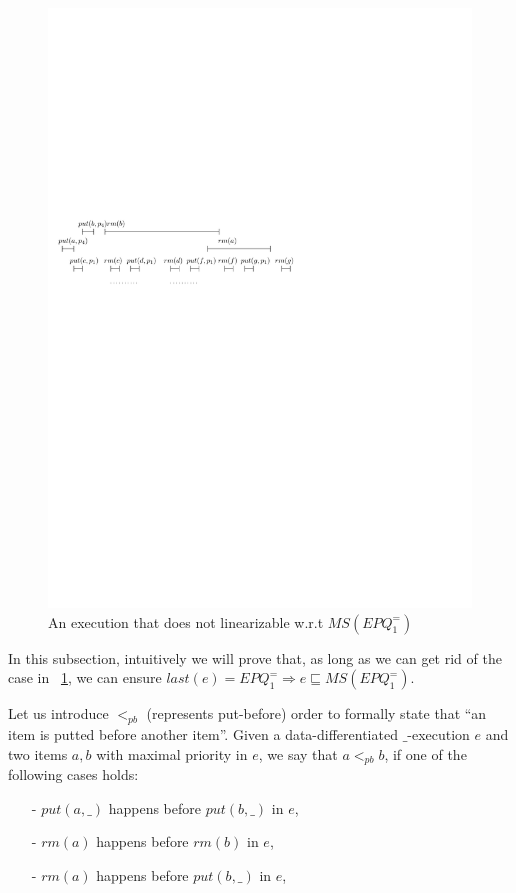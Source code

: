 \begin{figure}[htbp]
  \centering
  \includegraphics[width=0.6 \textwidth]{figures/PIC-HIS-INTRO-PB-ORDER-EPQ.pdf}
  \caption{An execution that does not linearizable w.r.t $\textit{MS}(\textit{EPQ}_1^{=})$}
  \label{fig:introduce pb order}
\end{figure}

In this subsection, intuitively we will prove that, as long as we can get rid of the case in \figurename~\ref{fig:introduce pb order}, we can ensure $\textit{last}(e) = \textit{EPQ}_1^{=} \Rightarrow e \sqsubseteq \textit{MS}(\textit{EPQ}_1^{=})$.

Let us introduce $<_{\textit{pb}}$ (represents put-before) order to formally state that ``an item is putted before another item''. Given a data-differentiated $\_$-execution $e$ and two items $a,b$ with maximal priority in $e$, we say that $a <_{\textit{pb}} b$, if one of the following cases holds:

\begin{itemize}
\setlength{\itemsep}{0.5pt}
\item[-] $\textit{put}(a,\_)$ happens before $\textit{put}(b,\_)$ in $e$,

\item[-] $\textit{rm}(a)$ happens before $\textit{rm}(b)$ in $e$,

\item[-] $\textit{rm}(a)$ happens before $\textit{put}(b,\_)$ in $e$,
\end{itemize}

